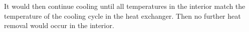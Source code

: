 It would then continue cooling until all temperatures in the interior match the temperature of the cooling cycle in the heat exchanger. Then no further heat removal would occur in the interior.